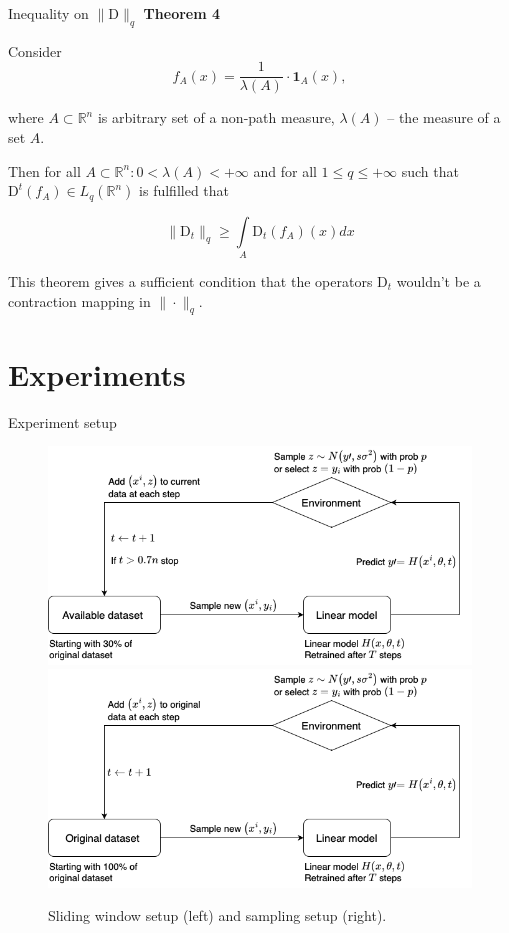 \documentclass[aspectratio=169]{beamer}
\begin{document}
    \begin{frame}{Inequality on $\|\text{D}\|_q$}
        \large{\textcolor{myNewColorA}{\textbf{Theorem 4}}}
        \normalsize
        
        Consider 
        \begin{equation*}
            f_A(x) = \dfrac{1}{\lambda(A)} \cdot \textbf{1}_{A}(x),
        \end{equation*}

        where $A \subset \mathbb{R}^n$ is arbitrary set of a non-path measure, $\lambda(A)$ -- the measure of a set $A$.

        Then for all $A \subset \mathbb{R}^n :  0 < \lambda(A) < +\infty$ and for all $1 \leq q \leq +\infty$ such that $\text{D}^t(f_A) \in L_q(\mathbb{R}^n)$ is fulfilled that  

        \begin{equation*}
            \|\text{D}_t\|_q \geq \int\limits_{A} \text{D}_t(f_A)(x)dx
        \end{equation*}

        This theorem gives a sufficient condition that the operators $\text{D}_t$ wouldn't be a contraction mapping in $\|\cdot\|_q$.
    \end{frame}

\section{Experiments}

    \begin{frame}{Experiment setup}
        \begin{figure}[h!]
            \centering
            \includegraphics[width=0.49\linewidth]{pictures/Hidden_loop.png}
            \includegraphics[width=0.49\linewidth]{pictures/Hidden_sample.png}\\
            
            \caption{Sliding window setup (left) and sampling setup (right).}
            \label{w_1}
        \end{figure}
        
    \end{frame}
\end{document}
